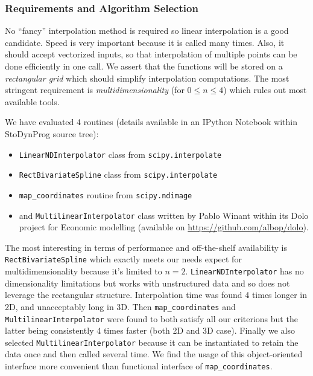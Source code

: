 \documentclass[letterpaper,compsoc,twoside]{IEEEtran}
\begin{document}
\subsubsection{Requirements and Algorithm Selection\label{requirements-and-algorithm-selection}}


No “fancy” interpolation method is required so linear interpolation is a
good candidate. Speed is very important because it is called many times.
Also, it should accept vectorized inputs, so that interpolation of
multiple points can be done efficiently in one call.
We assert that the functions will be stored on
a \emph{rectangular grid} which should simplify interpolation computations.
The most stringent requirement is \emph{multidimensionality} (for
$0 \leq n \leq 4$) which rules out most available tools.

We have evaluated 4 routines (details available in an IPython Notebook
within StoDynProg source tree):\begin{itemize}

\item 

\texttt{LinearNDInterpolator} class from \texttt{scipy.interpolate}
\item 

\texttt{RectBivariateSpline} class from \texttt{scipy.interpolate}
\item 

\texttt{map\_coordinates} routine from \texttt{scipy.ndimage}
\item 

and \texttt{MultilinearInterpolator} class written by Pablo Winant within
its Dolo project \cite{Winant-2010} for Economic modelling (available on
\url{https://github.com/albop/dolo}).
\end{itemize}


The most interesting in terms of performance and off-the-shelf
availability is \texttt{RectBivariateSpline} which exactly meets our needs
expect for multidimensionality because it’s limited to $n=2$.
\texttt{LinearNDInterpolator} has no dimensionality limitations but works
with unstructured data and so does not leverage the rectangular
structure. Interpolation time was found 4 times longer in 2D, and
unacceptably long in 3D. Then \texttt{map\_coordinates} and
\texttt{MultilinearInterpolator} were found to both satisfy all our
criterions but the latter being consistently 4 times faster (both 2D and
3D case). Finally we also selected \texttt{MultilinearInterpolator} because
it can be instantiated to retain the data once and then called several
time. We find the usage of this object-oriented interface more
convenient than functional interface of \texttt{map\_coordinates}.
\end{document}
